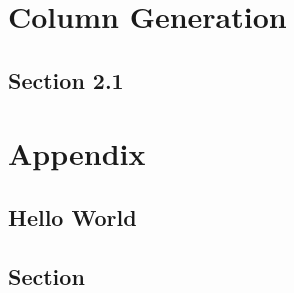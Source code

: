 \documentclass{note}
\begin{document}
\chapter{Column Generation}

\lipsum[5-10]

\section{Section 2.1}

\lipsum[5-10]

\backmatter

% 

\chapter*{Appendix}

\lipsum[5-10]

\section*{Hello World}

\lipsum[10-20]

\section{Section}

\lipsum[5-10]


\end{document}
